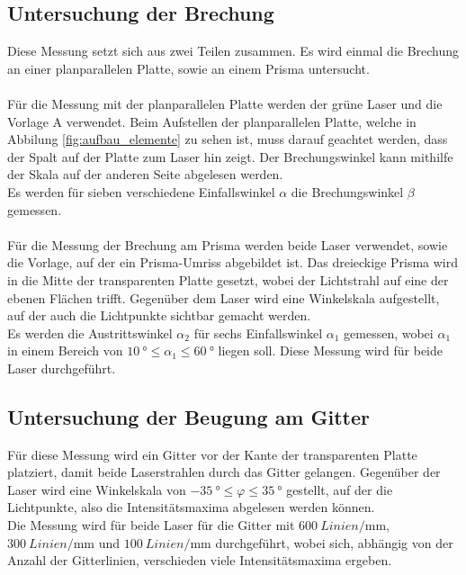 \subsection{Untersuchung der Brechung}

    Diese Messung setzt sich aus zwei Teilen zusammen.
    Es wird einmal die Brechung an einer planparallelen Platte,
    sowie an einem Prisma untersucht.\\
    \\
    Für die Messung mit der planparallelen Platte werden der grüne Laser und die Vorlage A verwendet.
    Beim Aufstellen der planparallelen Platte,
    welche in Abbilung \ref{fig:aufbau_elemente} zu sehen ist,
    muss darauf geachtet werden,
    dass der Spalt auf der Platte zum Laser hin zeigt.
    Der Brechungswinkel kann mithilfe der Skala auf der anderen Seite abgelesen werden.\\
    Es werden für sieben verschiedene Einfallswinkel $\alpha$ die Brechungswinkel $\beta$ gemessen.\\
    \\
    Für die Messung der Brechung am Prisma werden beide Laser verwendet, 
    sowie die Vorlage,
    auf der ein Prisma-Umriss abgebildet ist.
    Das dreieckige Prisma wird in die Mitte der transparenten Platte gesetzt,
    wobei der Lichtstrahl auf eine der ebenen Flächen trifft.
    Gegenüber dem Laser wird eine Winkelskala aufgestellt,
    auf der auch die Lichtpunkte sichtbar gemacht werden.\\
    Es werden die Austrittswinkel $\alpha_2$ für sechs Einfallswinkel $\alpha_1$ gemessen,
    wobei $\alpha_1$ in einem Bereich von $\SI{10}{\degree} \leq \alpha_1 \leq \SI{60}{\degree}$ liegen soll.
    Diese Messung wird für beide Laser durchgeführt.

\subsection{Untersuchung der Beugung am Gitter}

    Für diese Messung wird ein Gitter vor der Kante der transparenten Platte platziert,
    damit beide Laserstrahlen durch das Gitter gelangen.
    Gegenüber der Laser wird eine Winkelskala von $\SI{-35}{\degree} \leq \varphi \leq \SI{35}{\degree}$ gestellt,
    auf der die Lichtpunkte,
    also die Intensitätsmaxima abgelesen werden können.\\
    Die Messung wird für beide Laser für die Gitter mit $\SI{600}{{Linien}\per\milli\meter}$,
    $\SI{300}{{Linien}\per\milli\meter}$ und $\SI{100}{{Linien}\per\milli\meter}$ durchgeführt,
    wobei sich,
    abhängig von der Anzahl der Gitterlinien,
    verschieden viele Intensitätsmaxima ergeben.